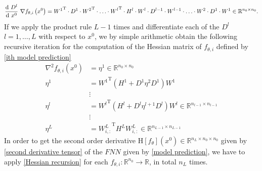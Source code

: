 \begin{equation*}
    \frac{\textup{d} \ D^{l}}{\textup{d} \ x^0} \  \nabla f_{\theta, i} \left(x^0\right) = {W^{1}}^{\mathrm{T}} \cdot D^{1} \cdot {W^{2}}^{\mathrm{T}} \cdot \ldots \cdot {W^{l}}^{\mathrm{T}} \cdot H^{l} \cdot W^l \cdot D^{l-1} \cdot W^{l-1} \cdot \ldots \cdot W^2 \cdot D^1 \cdot W^{1} \in \mathbb{R}^{n_{0} \times n_0}.
\end{equation*}
If we apply the product rule $L-1$ times and differentiate each of the $D^l$ $l = 1, \ldots, L$ with respect to $x^0$, we by simple arithmetic obtain the following recursive iteration for the computation of the Hessian matrix of $f_{\theta, i}$ defined by \cref{ith model prediction} 
\begin{equation}
    \label{Hessian recursion}
    \begin{aligned}
        \nabla^{2} f_{\theta, i} \left(x^0\right) & = \eta^{1} \in \mathbb{R}^{n_0 \times n_0} \\
        \eta^{1} & = {W^{1}}^{\mathrm{T}} \left( H^{1} + D^{1} \eta^{2} D^{1} \right) W^{1} \\
        & \vdots \\
        \eta^{l} & = {W^{l}}^{\mathrm{T}} \left( H^{l} + D^{l} \eta^{l+1} D^{l} \right) W^{l} \in \mathbb{R}^{n_{l-1} \times n_{l-1}} \\
        & \vdots \\
        \eta^{L} & = {W^L_{i,:}}^{\mathrm{T}} H^{L} W^L_{i,:} \in \mathbb{R}^{n_{L-1} \times n_{L-1}}
    \end{aligned}
\end{equation}
In order to get the second order derivative $\mathrm{H} \left[f_{\theta} \right]\left(x^0\right) \in \mathbb{R}^{n_L \times n_0 \times n_0}$ given by \cref{second derivative tensor} of the $FNN$ given by \cref{model prediction}, we have to apply \cref{Hessian recursion} for each $f_{\theta, i} \colon \mathbb{R}^{n_0} \to \mathbb{R}$, in total $n_L$ times.  \\

